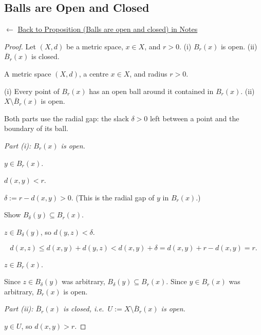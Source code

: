 
\subsection*{Balls are Open and Closed}
\label{prf:balls-open-closed}

\begin{remark*}[Return]
$\leftarrow$ \hyperref[prop:balls-open-closed]{Back to Proposition (Balls are open and closed) in Notes}
\end{remark*}

\begin{proof}
\Claim Let $(X,d)$ be a metric space, $x \in X$, and $r > 0$.
(i) $B_r(x)$ is open. \quad (ii) $\overline{B}_r(x)$ is closed.

\Given A metric space $(X,d)$, a centre $x \in X$, and radius $r > 0$.

\Goal (i) Every point of $B_r(x)$ has an open ball around it contained in $B_r(x)$.
(ii) $X \setminus \overline{B}_r(x)$ is open.

\Strategy Both parts use the radial gap: the slack $\delta > 0$ left
between a point and the boundary of its ball.

\medskip
\noindent\textit{Part (i): $B_r(x)$ is open.}

\Let $y \in B_r(x)$.

\ByDef $d(x, y) < r$.

\Let $\delta := r - d(x, y) > 0$. (This is the radial gap of $y$ in $B_r(x)$.)

\Goal Show $B_\delta(y) \subseteq B_r(x)$.

\Let $z \in B_\delta(y)$, so $d(y, z) < \delta$.

\[
d(x, z) \le d(x, y) + d(y, z) < d(x, y) + \delta = d(x,y) + r - d(x,y) = r.
\]

\Therefore $z \in B_r(x)$.

Since $z \in B_\delta(y)$ was arbitrary, $B_\delta(y) \subseteq B_r(x)$.
Since $y \in B_r(x)$ was arbitrary, $B_r(x)$ is open. \AsReq

\medskip
\noindent\textit{Part (ii): $\overline{B}_r(x)$ is closed, i.e.\ $U := X \setminus \overline{B}_r(x)$ is open.}

\Let $y \in U$, so $d(x, y) > r$.


\end{proof}
